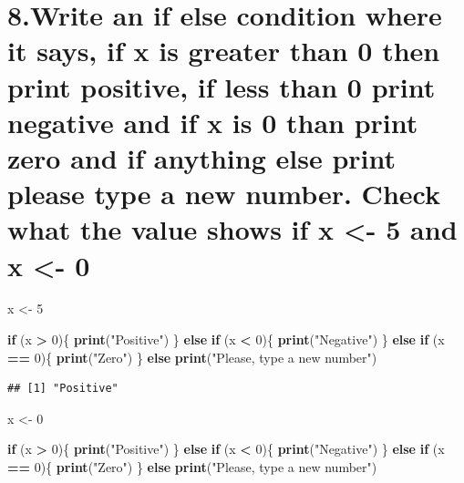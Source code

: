 \documentclass[]{article}
\newenvironment{Shaded}{\begin{snugshade}}{\end{snugshade}}
\newcommand{\ControlFlowTok}[1]{\textcolor[rgb]{0.13,0.29,0.53}{\textbf{#1}}}
\newcommand{\DecValTok}[1]{\textcolor[rgb]{0.00,0.00,0.81}{#1}}
\newcommand{\KeywordTok}[1]{\textcolor[rgb]{0.13,0.29,0.53}{\textbf{#1}}}
\newcommand{\NormalTok}[1]{#1}
\newcommand{\OperatorTok}[1]{\textcolor[rgb]{0.81,0.36,0.00}{\textbf{#1}}}
\newcommand{\StringTok}[1]{\textcolor[rgb]{0.31,0.60,0.02}{#1}}
\begin{document}
\hypertarget{write-an-if-else-condition-where-it-says-if-x-is-greater-than-0-then-print-positive-if-less-than-0-print-negative-and-if-x-is-0-than-print-zero-and-if-anything-else-print-please-type-a-new-number.-check-what-the-value-shows-if-x---5-and-x---0}{%
\section{8.Write an if else condition where it says, if x is greater
than 0 then print positive, if less than 0 print negative and if x is 0
than print zero and if anything else print please type a new number.
Check what the value shows if x \textless{}- 5 and x \textless{}-
0}\label{write-an-if-else-condition-where-it-says-if-x-is-greater-than-0-then-print-positive-if-less-than-0-print-negative-and-if-x-is-0-than-print-zero-and-if-anything-else-print-please-type-a-new-number.-check-what-the-value-shows-if-x---5-and-x---0}}

\begin{Shaded}
\begin{Highlighting}[]
\NormalTok{x <-}\StringTok{ }\DecValTok{5}

\ControlFlowTok{if}\NormalTok{ (x }\OperatorTok{>}\StringTok{ }\DecValTok{0}\NormalTok{)\{}
  \KeywordTok{print}\NormalTok{(}\StringTok{"Positive"}\NormalTok{)}
\NormalTok{\} }\ControlFlowTok{else} \ControlFlowTok{if}\NormalTok{ (x }\OperatorTok{<}\StringTok{ }\DecValTok{0}\NormalTok{)\{}
  \KeywordTok{print}\NormalTok{(}\StringTok{"Negative"}\NormalTok{)}
\NormalTok{\} }\ControlFlowTok{else} \ControlFlowTok{if}\NormalTok{ (x }\OperatorTok{==}\StringTok{ }\DecValTok{0}\NormalTok{)\{}
  \KeywordTok{print}\NormalTok{(}\StringTok{"Zero"}\NormalTok{)}
\NormalTok{\} }\ControlFlowTok{else} 
  \KeywordTok{print}\NormalTok{(}\StringTok{"Please, type a new number"}\NormalTok{)}
\end{Highlighting}
\end{Shaded}

\begin{verbatim}
## [1] "Positive"
\end{verbatim}

\begin{Shaded}
\begin{Highlighting}[]
\NormalTok{x <-}\StringTok{ }\DecValTok{0}

\ControlFlowTok{if}\NormalTok{ (x }\OperatorTok{>}\StringTok{ }\DecValTok{0}\NormalTok{)\{}
  \KeywordTok{print}\NormalTok{(}\StringTok{"Positive"}\NormalTok{)}
\NormalTok{\} }\ControlFlowTok{else} \ControlFlowTok{if}\NormalTok{ (x }\OperatorTok{<}\StringTok{ }\DecValTok{0}\NormalTok{)\{}
  \KeywordTok{print}\NormalTok{(}\StringTok{"Negative"}\NormalTok{)}
\NormalTok{\} }\ControlFlowTok{else} \ControlFlowTok{if}\NormalTok{ (x }\OperatorTok{==}\StringTok{ }\DecValTok{0}\NormalTok{)\{}
  \KeywordTok{print}\NormalTok{(}\StringTok{"Zero"}\NormalTok{)}
\NormalTok{\} }\ControlFlowTok{else} 
  \KeywordTok{print}\NormalTok{(}\StringTok{"Please, type a new number"}\NormalTok{)}
\end{Highlighting}
\end{Shaded}
\end{document}

